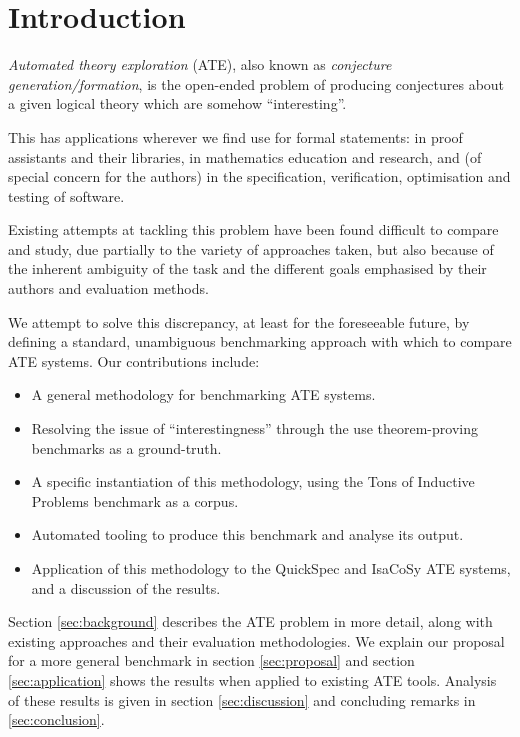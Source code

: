 \section{Introduction}
\label{intro}


\emph{Automated theory exploration} (ATE), also known as
\emph{conjecture generation/formation}, is the open-ended problem of producing
conjectures about a given logical theory which are somehow ``interesting''.

This has applications wherever we find use for formal statements: in proof
assistants and their libraries, in mathematics education and research, and
(of special concern for the authors) in the specification, verification,
optimisation and testing of software.

Existing attempts at tackling this problem have been found difficult to compare
and study, due partially to the variety of approaches taken, but also because of
the inherent ambiguity of the task and the different goals emphasised by their
authors and evaluation methods.

We attempt to solve this discrepancy, at least for the foreseeable future, by
defining a standard, unambiguous benchmarking approach with which to compare
ATE systems. Our contributions include:

\begin{itemize}
\item A general methodology for benchmarking ATE systems.
\item Resolving the issue of ``interestingness'' through the use theorem-proving
  benchmarks as a ground-truth.
\item A specific instantiation of this methodology, using the Tons of Inductive
  Problems benchmark as a corpus.
\item Automated tooling to produce this benchmark and analyse its output.
\item Application of this methodology to the QuickSpec and IsaCoSy ATE systems,
  and a discussion of the results.
\end{itemize}

Section \ref{sec:background} describes the ATE problem in more detail, along
with existing approaches and their evaluation methodologies. We explain our
proposal for a more general benchmark in section \ref{sec:proposal} and
section \ref{sec:application} shows the results when applied to existing ATE tools.
Analysis of these results is given in section \ref{sec:discussion} and
concluding remarks in \ref{sec:conclusion}.

